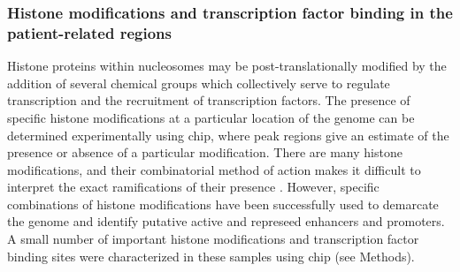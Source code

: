 \subsubsection{Histone modifications and transcription factor binding in the patient-related regions}

Histone proteins within nucleosomes may be post-translationally modified by the addition of several chemical groups which collectively serve to regulate transcription and the recruitment of transcription factors. The presence of specific histone modifications at a particular location of the genome can be determined experimentally using \gls{chip}, where peak regions give an estimate of the presence or absence of a particular modification. There are many histone modifications, and their combinatorial method of action makes it difficult to interpret the exact ramifications of their presence \cite{T2001}. However, specific combinations of histone modifications have been successfully used to demarcate the genome and identify putative active and represeed enhancers and promoters. A small number of important histone modifications and transcription factor binding sites were characterized in these samples using \gls{chip} (see Methods).  

